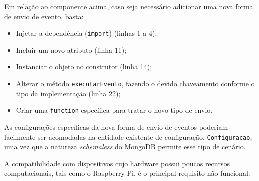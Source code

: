 Em relação ao componente acima, caso seja necessário adicionar uma nova forma de envio de evento, basta:

\begin{itemize}
	 \item Injetar a dependência (\verb|import|) (linhas 1 a 4);
	 \item Incluir um novo atributo (linha 11); 
	 \item Instanciar o objeto no construtor (linha 14);
	 \item Alterar o método \verb|executarEvento|, fazendo o devido chaveamento conforme o tipo da implementação (linha 22);
	 \item Criar uma \verb|function| específica para tratar o novo tipo de envio.
\end{itemize}

As configurações específicas da nova forma de envio de eventos poderiam facilmente ser acomodadas na entidade existente de configuração, \verb|Configuracao|, uma vez que a natureza \textit{schemaless} do MongoDB permite esse tipo de cenário.

A compatibilidade com dispositivos cujo hardware possui poucos recursos computacionais, tais como o Raspberry Pi, é o principal requisito não funcional.